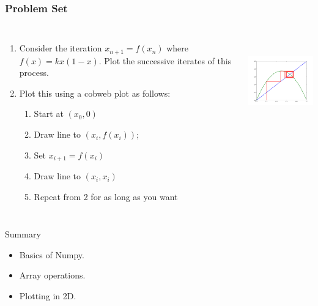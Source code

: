 \documentclass[14pt,compress]{beamer}
\newcounter{time}
\newcommand{\inctime}[1]{\addtocounter{time}{#1}{\tiny \thetime\ m}}
\begin{document}
\begin{frame}[fragile] 
\frametitle{Problem Set}
  \begin{columns}
    \small{
    \begin{enumerate}
      \item Consider the iteration $x_{n+1} = f(x_n)$ where $f(x) =
          kx(1-x)$.  Plot the successive iterates of this process.
      \item Plot this using a cobweb plot as follows:
          \begin{enumerate}
              \item Start at $(x_0, 0)$
              \item Draw line to $(x_i, f(x_i))$; 
              \item Set $x_{i+1} = f(x_i)$
              \item Draw line to $(x_i, x_i)$
              \item Repeat from 2 for as long as you want 
          \end{enumerate}
    \end{enumerate}}
    \hspace*{-0.5in}
  \includegraphics[height=1.6in, interpolate=true]{data/cobweb}  
\end{columns}
\inctime{20}
\end{frame}
\begin{frame}{Summary}
  \begin{itemize}
  \item Basics of Numpy.
  \item Array operations.
  \item Plotting in 2D.
  \end{itemize}
\end{frame}
\end{document}
